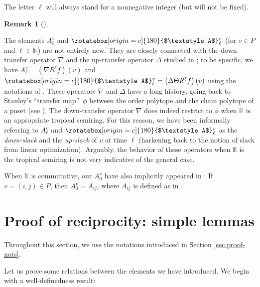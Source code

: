 \documentclass[numbers=enddot,12pt,final,onecolumn,notitlepage]{scrartcl}%
\theoremstyle{definition}
\newtheorem{remk}[theo]{Remark}
\newenvironment{remark}[1][]
{\begin{remk}[#1]\begin{leftbar}}
{\end{leftbar}\end{remk}}
\newcommand{\upslack}{\mathchoice{\rotatebox[origin=c]{180}{$\displaystyle A$}}{\rotatebox[origin=c]{180}{$\textstyle A$}}{\rotatebox[origin=c]{180}{$\scriptstyle A$}}{\rotatebox[origin=c]{180}{$\scriptscriptstyle A$}}}
\newcommand{\downslack}{A}
\begin{document}
The letter $\ell$ will always stand for a nonnegative integer (but will not be fixed).

\begin{remark}
The elements $\downslack_{\ell}^{v}$ and $\upslack_{\ell}^{v}$ (for $v\in P$
and $\ell\in\mathbb{N}$) are not entirely new. They are closely connected with
the down-transfer operator $\nabla$ and the up-transfer operator $\Delta$
studied in \cite[Definition 5.11]{JosRob20}; to be specific, we have
$\downslack_{\ell}^{v}=\left(  \nabla R^{\ell}f\right)  \left(  v\right)  $
and $\upslack_{\ell}^{v}=\left(  \Delta\Theta R^{\ell}f\right)  \left(
v\right)  $ using the notations of \cite[Definition 5.11]{JosRob20}. These
operators $\nabla$ and $\Delta$ have a long history, going back to Stanley's
\textquotedblleft transfer map\textquotedblright\ $\phi$ between the order
polytope and the chain polytope of a poset (see \cite[Definition
3.1]{stanley-polytopes}). The down-transfer operator $\nabla$ does indeed
restrict to $\phi$ when $\mathbb{K}$ is an appropriate tropical semiring. For
this reason, we have been informally referring to $\downslack_{\ell}^{v}$ and
$\upslack_{\ell}^{v}$ as the \emph{down-slack} and the \emph{up-slack} of $v$
at time $\ell$ (harkening back to the notion of slack from linear
optimization). Arguably, the behavior of these operators when $\mathbb{K}$ is
the tropical semiring is not very indicative of the general case.

When $\mathbb{K}$ is commutative, our $\downslack_{0}^{v}$ have also
implicitly appeared in \cite{MusRob17}: If $v=\left(  i,j\right)  \in P$, then
$\downslack_{0}^{v}=\overline{A_{ij}}$, where $A_{ij}$ is defined as in
\cite[(1)]{MusRob17}.
\end{remark}

\section{\label{sec.proof-lems}Proof of reciprocity: simple lemmas}

Throughout this section, we use the notations introduced in Section
\ref{sec.proof-nots}.



Let us prove some relations between the elements we have introduced. We begin
with a well-definedness result:
\end{document}
